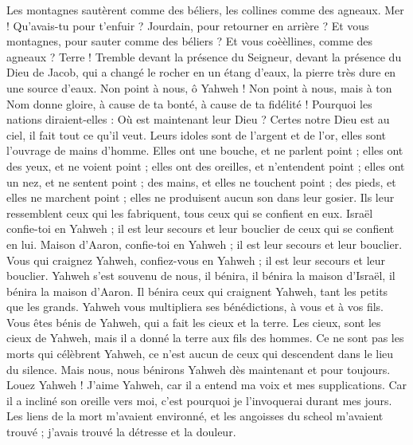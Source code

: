 \begin{multicols}{2}
Les montagnes sautèrent comme des béliers, les collines comme des agneaux.
Mer ! Qu’avais-tu pour t'enfuir ? Jourdain, pour retourner en arrière ?
Et vous montagnes, pour sauter comme des béliers ? Et vous coèèllines, comme des agneaux ?
Terre ! Tremble devant la présence du Seigneur, devant la présence du Dieu de Jacob,
qui a changé le rocher en un étang d'eaux, la pierre très dure en une source d'eaux.
\VerseOne{}Non point à nous, ô Yahweh ! Non point à nous, mais à ton Nom donne gloire, à cause de ta bonté, à cause de ta fidélité !
Pourquoi les nations diraient-elles : Où est maintenant leur Dieu ?
Certes notre Dieu est au ciel, il fait tout ce qu'il veut.
Leurs idoles sont de l’argent et de l’or, elles sont l’ouvrage de mains d'homme.
Elles ont une bouche, et ne parlent point ; elles ont des yeux, et ne voient point ;
elles ont des oreilles, et n'entendent point ; elles ont un nez, et ne sentent point ;
des mains, et elles ne touchent point ; des pieds, et elles ne marchent point ; elles ne produisent aucun son dans leur gosier.
Ils leur ressemblent ceux qui les fabriquent, tous ceux qui se confient en eux.
Israël confie-toi en Yahweh ; il est leur secours et leur bouclier de ceux qui se confient en lui.
Maison d'Aaron, confie-toi en Yahweh ; il est leur secours et leur bouclier.
Vous qui craignez Yahweh, confiez-vous en Yahweh ; il est leur secours et leur bouclier.
Yahweh s'est souvenu de nous, il bénira, il bénira la maison d'Israël, il bénira la maison d'Aaron.
Il bénira ceux qui craignent Yahweh, tant les petits que les grands.
Yahweh vous multipliera ses bénédictions, à vous et à vos fils.
Vous êtes bénis de Yahweh, qui a fait les cieux et la terre.
Les cieux, sont les cieux de Yahweh, mais il a donné la terre aux fils des hommes.
Ce ne sont pas les morts qui célèbrent Yahweh, ce n’est aucun de ceux qui descendent dans le lieu du silence.
Mais nous, nous bénirons Yahweh dès maintenant et pour toujours. Louez Yahweh !
\VerseOne{}J'aime Yahweh, car il a entend ma voix et mes supplications.
Car il a incliné son oreille vers moi, c'est pourquoi je l'invoquerai durant mes jours.
Les liens de la mort m'avaient environné, et les angoisses du scheol m'avaient trouvé ; j'avais trouvé la détresse et la douleur.

\end{multicols}

